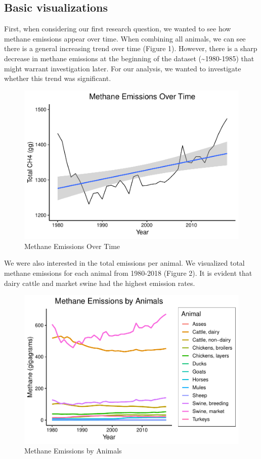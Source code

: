 \documentclass[
  12pt,
]{article}
\begin{document}
\hypertarget{basic-visualizations}{%
\subsection{Basic visualizations}\label{basic-visualizations}}

First, when considering our first research question, we wanted to see
how methane emissions appear over time. When combining all animals, we
can see there is a general increasing trend over time (Figure 1).
However, there is a sharp decrease in methane emissions at the beginning
of the dataset (\textasciitilde1980-1985) that might warrant
investigation later. For our analysis, we wanted to investigate whether
this trend was significant.

\begin{figure}
\centering
\includegraphics{SultzerSwitFinalProject_files/figure-latex/unnamed-chunk-2-1.pdf}
\caption{Methane Emissions Over Time}
\end{figure}

We were also interested in the total emissions per animal. We visualized
total methane emissions for each animal from 1980-2018 (Figure 2). It is
evident that dairy cattle and market swine had the highest emission
rates.

\begin{figure}
\centering
\includegraphics{SultzerSwitFinalProject_files/figure-latex/unnamed-chunk-3-1.pdf}
\caption{Methane Emissions by Animals}
\end{figure}
\end{document}
